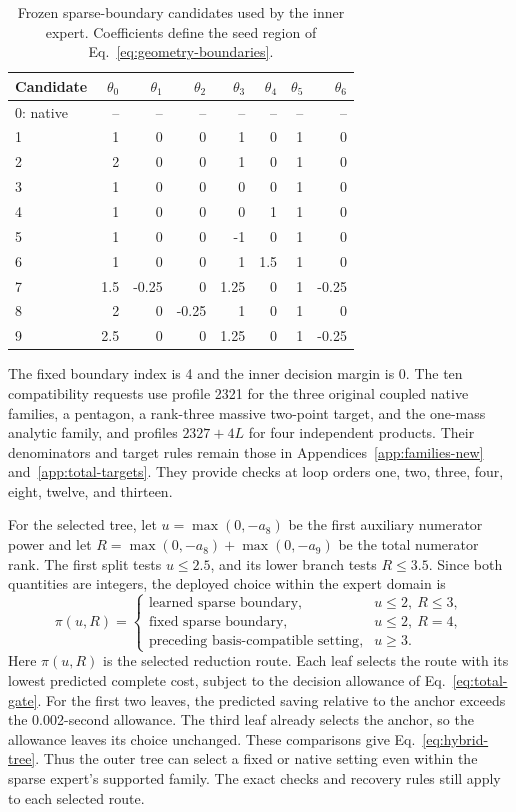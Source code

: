 \begin{table}[!htbp]\centering\small
\caption{Frozen sparse-boundary candidates used by the inner expert. Coefficients define the seed region of Eq.~\eqref{eq:geometry-boundaries}.}
\label{tab:hybrid-boundaries}
\begin{tabular}{@{}lrrrrrrr@{}}\toprule
Candidate & $\theta_0$ & $\theta_1$ & $\theta_2$ & $\theta_3$ & $\theta_4$ & $\theta_5$ & $\theta_6$\\\midrule
0: native & -- & -- & -- & -- & -- & -- & --\\
1 & 1 & 0 & 0 & 1 & 0 & 1 & 0\\
2 & 2 & 0 & 0 & 1 & 0 & 1 & 0\\
3 & 1 & 0 & 0 & 0 & 0 & 1 & 0\\
4 & 1 & 0 & 0 & 0 & 1 & 1 & 0\\
5 & 1 & 0 & 0 & -1 & 0 & 1 & 0\\
6 & 1 & 0 & 0 & 1 & 1.5 & 1 & 0\\
7 & 1.5 & -0.25 & 0 & 1.25 & 0 & 1 & -0.25\\
8 & 2 & 0 & -0.25 & 1 & 0 & 1 & 0\\
9 & 2.5 & 0 & 0 & 1.25 & 0 & 1 & -0.25\\
\bottomrule\end{tabular}\end{table}

The fixed boundary index is 4 and the inner decision margin is 0. The ten compatibility requests use profile 2321 for the three original coupled native families, a pentagon, a rank-three massive two-point target, and the one-mass analytic family, and profiles $2327+4L$ for four independent products. Their denominators and target rules remain those in Appendices~\ref{app:families-new} and~\ref{app:total-targets}. They provide checks at loop orders one, two, three, four, eight, twelve, and thirteen.

For the selected tree, let $u=\max(0,-a_8)$ be the first auxiliary numerator power and let $R=\max(0,-a_8)+\max(0,-a_9)$ be the total numerator rank. The first split tests $u\leq2.5$, and its lower branch tests $R\leq3.5$. Since both quantities are integers, the deployed choice within the expert domain is
\begin{equation}
 \pi(u,R)=\begin{cases}
  \text{learned sparse boundary},&u\leq2,\ R\leq3,\\
  \text{fixed sparse boundary},&u\leq2,\ R=4,\\
  \text{preceding basis-compatible setting},&u\geq3.
 \end{cases}
 \label{eq:hybrid-tree}
\end{equation}
Here $\pi(u,R)$ is the selected reduction route. Each leaf selects the route with its lowest predicted complete cost, subject to the decision allowance of Eq.~\eqref{eq:total-gate}. For the first two leaves, the predicted saving relative to the anchor exceeds the 0.002-second allowance. The third leaf already selects the anchor, so the allowance leaves its choice unchanged. These comparisons give Eq.~\eqref{eq:hybrid-tree}. Thus the outer tree can select a fixed or native setting even within the sparse expert's supported family. The exact checks and recovery rules still apply to each selected route.
